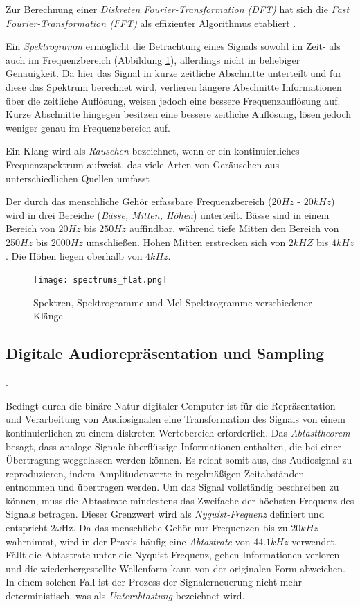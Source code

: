 \documentclass[
  a4paper,  %
  twoside,  %
  bibliography=totoc,
  headsepline,
  cleardoublepage=empty,
  parskip=half,
  draft=false
]{scrbook}
\begin{document}
Zur Berechnung einer \emph{Diskreten Fourier-Transformation (DFT)} hat sich die \emph{Fast Fourier-Transformation (FFT)} als effizienter Algorithmus etabliert \cite{heideman_gauss_1985}. 

Ein \emph{Spektrogramm} ermöglicht die Betrachtung eines Signals sowohl im Zeit- als auch im Frequenzbereich (Abbildung \ref{fig:spectro}), allerdings nicht in beliebiger Genauigkeit. Da hier das Signal in kurze zeitliche Abschnitte unterteilt und für diese das Spektrum berechnet wird, verlieren längere Abschnitte Informationen über die zeitliche Auflösung, weisen jedoch eine bessere Frequenzauflösung auf. Kurze Abschnitte hingegen besitzen eine bessere zeitliche Auflösung, lösen jedoch weniger genau im Frequenzbereich auf. \cite{raffaseder_audiodesign_2010}

Ein Klang wird als \emph{Rauschen} bezeichnet, wenn er ein kontinuierliches Frequenzspektrum aufweist, das viele Arten von Geräuschen aus unterschiedlichen Quellen umfasst
\cite{tsuji_physics_2021}. 

Der durch das menschliche Gehör erfassbare Frequenzbereich ($20 Hz$ -  $20kHz$) wird in drei Bereiche (\emph{Bässe, Mitten, Höhen}) unterteilt. Bässe sind in einem Bereich von $20Hz$ bis $250Hz$ auffindbar, während tiefe Mitten den Bereich von 250$Hz$ bis $2000Hz$ umschließen. Hohen Mitten erstrecken sich von $2kHZ$ bis $4kHz$. Die Höhen liegen oberhalb von $4kHz$. \cite{raffaseder_audiodesign_2010}

\begin{figure}
  \centering
  \texttt{[image: spectrums\_flat.png]}
  \caption[Fourier Reihe]{Spektren, Spektrogramme und Mel-Spektrogramme verschiedener Klänge}
  \label{fig:spectro}
\end{figure}


\subsection{Digitale Audiorepräsentation und Sampling}. 

Bedingt durch die binäre Natur digitaler Computer ist für die Repräsentation und Verarbeitung von Audiosignalen eine Transformation des Signals von einem kontinuierlichen zu einem diskreten Wertebereich erforderlich. Das \emph{Abtasttheorem} besagt, dass analoge Signale überflüssige Informationen enthalten, die bei einer Übertragung weggelassen werden können. Es reicht somit aus, das Audiosignal zu reproduzieren, indem Amplitudenwerte in regelmäßigen Zeitabständen entnommen und übertragen werden. Um das Signal vollständig beschreiben zu können, muss die Abtastrate mindestens das Zweifache der höchsten Frequenz des Signals betragen. Dieser Grenzwert wird als \emph{Nyquist-Frequenz} definiert und entspricht $2 \omega \mathrm{Hz}$. Da das menschliche Gehör nur Frequenzen bis zu $20kHz$ wahrnimmt, wird in der Praxis häufig eine \emph{Abtastrate} von $44.1kHz$ verwendet. Fällt die Abtastrate unter die Nyquist-Frequenz, gehen Informationen verloren und die wiederhergestellte Wellenform kann von der originalen Form abweichen. In einem solchen Fall ist der Prozess der Signalerneuerung nicht mehr deterministisch, was als \emph{Unterabtastung} bezeichnet wird. \cite{lai_practical_2004, shannon_communication_1949, ruschkowski_elektronische_2019}
\end{document}
